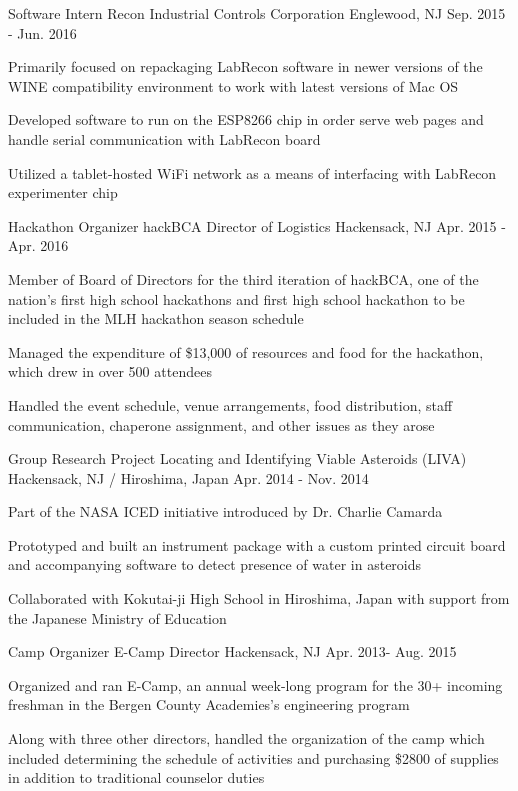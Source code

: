 \begin{cventries}
  \cventry
    {Software Intern}
    {Recon Industrial Controls Corporation}
    {Englewood, NJ}
    {Sep. 2015 - Jun. 2016}
    {
      \begin{cvitems}
        \item {Primarily focused on repackaging LabRecon software in newer versions of the
WINE compatibility environment to work with latest versions of Mac OS}
        \item {Developed software to run on the ESP8266 chip in order serve web pages and
handle serial communication with LabRecon board}
        \item {Utilized a tablet-hosted WiFi network as a means of interfacing with LabRecon
experimenter chip}
      \end{cvitems}
    }
  \cventry
    {Hackathon Organizer}
    {hackBCA Director of Logistics}
    {Hackensack, NJ}
    {Apr. 2015 - Apr. 2016}
    {
      \begin{cvitems}
        \item {Member of Board of Directors for the third iteration of hackBCA, one of the nation's first high school hackathons and first high school hackathon to be included in the MLH hackathon season schedule}
        \item {Managed the expenditure of \$13,000 of resources and food for the hackathon, which drew in over 500 attendees}
        \item { Handled the event schedule, venue arrangements, food distribution, staff
communication, chaperone assignment, and other issues as they arose}
      \end{cvitems}
    }
  \cventry
    {Group Research Project}
    {Locating and Identifying Viable Asteroids (LIVA)}
    {Hackensack, NJ / Hiroshima, Japan}
    {Apr. 2014 - Nov. 2014}
    {
      \begin{cvitems}
        \item {Part of the NASA ICED initiative introduced by Dr. Charlie Camarda}
        \item {Prototyped and built an instrument package with a custom printed circuit board and accompanying
software to detect presence of water in asteroids}
        \item {Collaborated with Kokutai-ji High School in Hiroshima, Japan with support from the
Japanese Ministry of Education}
      \end{cvitems}
    }
  \cventry
    {Camp Organizer}
    {E-Camp Director}
    {Hackensack, NJ}
    {Apr. 2013- Aug. 2015}
    {
      \begin{cvitems}
        \item {Organized and ran E-Camp, an annual week-long program for the 30+ incoming freshman in
the Bergen County Academies's engineering program}
        \item {Along with three other directors, handled the organization of the camp which
included determining the schedule of activities and purchasing \$2800 of supplies in addition to
traditional counselor duties}
      \end{cvitems}
    }
  

\end{cventries}
